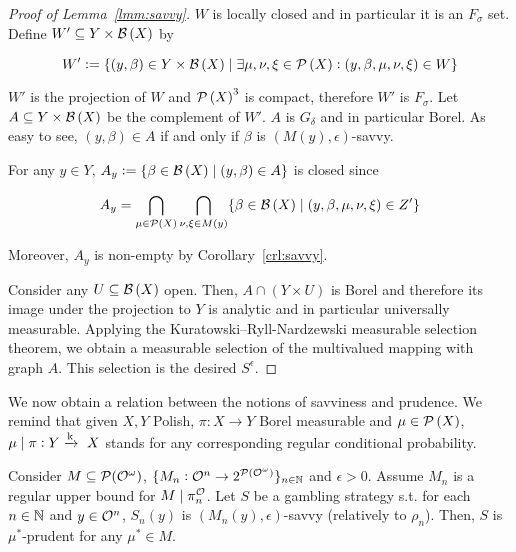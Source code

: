 \begin{proof}[Proof of Lemma~\ref{lmm:savvy}]
$W$ is locally closed and in particular it is an $F_\sigma$ set. Define $W' \subseteq Y \times \mathcal{B}\left(X\right)$ by

$$W':=\{\left(y,\beta\right) \in Y \times \mathcal{B}\left(X\right) \mid \exists \mu,\nu,\xi \in \mathcal{P}\left(X\right): \left(y,\beta,\mu,\nu,\xi\right) \in W\}$$

$W'$ is the projection of $W$ and $\mathcal{P}\left(X\right)^3$ is compact, therefore $W'$ is $F_\sigma$. Let $A \subseteq Y \times \mathcal{B}\left(X\right)$ be the complement of $W'$. $A$ is $G_\delta$ and in particular Borel. As easy to see, $\left(y,\beta\right) \in A$ if and only if $\beta$ is $\left(M\left(y\right),\epsilon\right)$-savvy.

For any $y \in Y$, $A_y:=\{\beta \in \mathcal{B}\left(X\right) \mid \left(y,\beta\right) \in A\}$ is closed since

$$A_y = \bigcap_{\mu \in \mathcal{P}\left(X\right)} \bigcap_{\nu,\xi \in M\left(y\right)} \{\beta \in \mathcal{B}\left(X\right) \mid \left(y,\beta,\mu,\nu,\xi\right) \in Z'\}$$

Moreover, $A_y$ is non-empty by Corollary~\ref{crl:savvy}.

Consider any $U \subseteq \mathcal{B}\left(X\right)$ open. Then, $A \cap \left(Y \times U\right)$ is Borel and therefore its image under the projection to $Y$ is analytic and in particular universally measurable. Applying the Kuratowski--Ryll-Nardzewski measurable selection theorem, we obtain a measurable selection of the multivalued mapping with graph $A$. This selection is the desired $S^\epsilon$.
\end{proof}

We now obtain a relation between the notions of savviness and prudence. We remind that given $X,Y$ Polish, $\pi: X \rightarrow Y$ Borel measurable and $\mu \in \mathcal{P}\left(X\right)$, $\mu \mid \pi: Y \xrightarrow{\textnormal{k}}\ X$ stands for any corresponding regular conditional probability.

\begin{samepage}
\begin{proposition}
\label{crl:savvy_is_prudent}

Consider $M \subseteq \mathcal{P}(\mathcal{O}^\omega)$, $\{M_n: \mathcal{O}^n \rightarrow 2^{\mathcal{P}(\mathcal{O}^\omega)}\}_{n \in \mathbb{N}}$ and $\epsilon > 0$. Assume $M_n$ is a regular upper bound for $M \mid \pi^{\mathcal{O}}_n$. Let $S$ be a gambling strategy s.t. for each $n \in \mathbb{N}$ and $y \in \mathcal{O}^n$, $S_n\left(y\right)$ is $\left(M_n(y),\epsilon\right)$-savvy (relatively to $\rho_n$). Then, $S$ is $\mu^*$-prudent for any $\mu^* \in M$.

\end{proposition}
\end{samepage}

